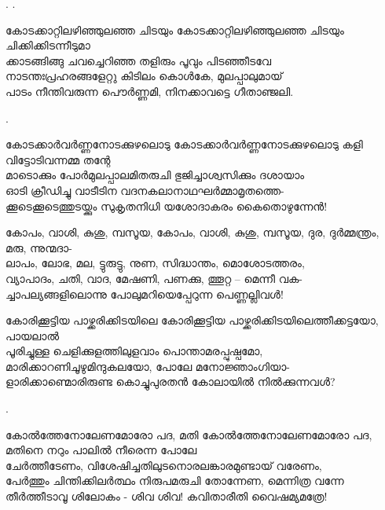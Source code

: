 \begin{enumerate}

.
.


\begin{slokam}{\VSv}{\VRV}{കോടക്കാറ്റിലഴിഞ്ഞുലഞ്ഞ ചിടയും}
കോടക്കാറ്റിലഴിഞ്ഞുലഞ്ഞ ചിടയും ചിക്കിക്കിടന്നീടുമാ\\
ക്കാടങ്ങിങ്ങു ചവച്ചെറിഞ്ഞ തളിരും പൂവും പിടഞ്ഞീടവേ\\
നാടന്തഃപ്രഹരങ്ങളേറ്റു കിടിലം കൊള്‍കേ, മുലപ്പാലുമായ്‌\\
പാടം നീന്തിവരുന്ന പൌര്‍ണ്ണമി, നിനക്കാവട്ടെ ഗീതാഞ്ജലി.
\end{slokam}



.


\begin{slokam}{\VSr}{\VenA}{കോടക്കാർവർണ്ണനോടക്കുഴലൊടു}
കോടക്കാർവർണ്ണനോടക്കുഴലൊടു കളി വിട്ടോടിവന്നമ്മ തന്റേ\\
മാടൊക്കും പോർമുലപ്പാലമിതരുചി ഭുജിച്ചാശ്വസിക്കും ദശായാം\\
ഓടി ക്രീഡിച്ചു വാടീടിന വദനകലാനാഥഘർമ്മാമൃതത്തെ-\\
ക്കൂടെക്കൂടെത്തുടയ്ക്കും സുകൃതനിധി യശോദാകരം കൈതൊഴുന്നേൻ!
\end{slokam}


\begin{slokam}{\VSv}{\SVL}{കോപം, വാശി, കുശു, മ്പസൂയ,}
കോപം, വാശി, കുശു, മ്പസൂയ, ദുര, ദുർമ്മന്ത്രം, മരു, ന്നുന്മദാ-\\
ലാപം, ലോഭ, മല, ട്ടുരുട്ടു, നുണ, സിദ്ധാന്തം, മൊശോടത്തരം,\\
വ്യാപാദം, ചതി, വാദ, മേഷണി, പണക്കു, ത്തൂറ്റ -- മെന്നീ വക-\\
ച്ചാപല്യങ്ങളിലൊന്നു പോലുമറിയെപ്പേറുന്ന പെണ്ണല്ലിവള്‍!
\end{slokam}



\begin{slokam}{\VSv}{\VNM}{കോരിക്കൂട്ടിയ പാഴ്ക്കരിക്കിടയിലെ}
കോരിക്കൂട്ടിയ പാഴ്ക്കരിക്കിടയിലെത്തീക്കട്ടയോ, പായലാൽ\\
പൂരിച്ചുള്ള ചെളിക്കുളത്തിലുളവാം പൊന്താമരപ്പുഷ്പമോ,\\
മാരിക്കാറണിചൂഴുമിന്ദുകലയോ, പോലേ മനോജ്ഞാംഗിയാ-\\
ളാരിക്കാണ്മൊരിരുണ്ട കൊച്ചുപുരതൻ കോലായിൽ നിൽക്കുന്നവള്‍?
\end{slokam}

.

\begin{slokam}{\VSr}{\KN}{കോൽത്തേനോലേണമോരോ പദ, മതി}
കോൽത്തേനോലേണമോരോ പദ, മതിനെ നറും പാലിൽ നീരെന്ന പോലേ\\
ചേർത്തീടേണം, വിശേഷിച്ചതിലുടനൊരലങ്കാരമുണ്ടായ്‌ വരേണം,\\
പേർത്തും ചിന്തിക്കിലർത്ഥം നിരുപമരുചി തോന്നേണ, മെന്നിത്ര വന്നേ\\
തീർത്തീടാവൂ ശിലോകം - ശിവ ശിവ! കവിതാരീതി വൈഷമ്യമത്രേ!
\end{slokam}


\end{enumerate}
